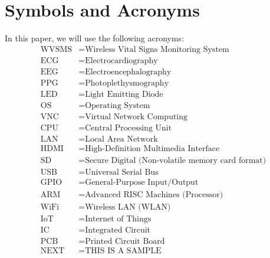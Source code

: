 
\chapter*{Symbols and  Acronyms}
  

\vspace{1cm}

In this paper, we  will  use the  following  acronyms:
\begin{align*}
\mbox{WVSMS} & =  \mbox{Wireless Vital Signs Monitoring System}    \\
\mbox{ECG} & =  \mbox{Electrocardiography}     \\
\mbox{EEG} & =  \mbox{Electroencephalography}     \\
\mbox{PPG} & =  \mbox{Photoplethysmography}    \\
\mbox{LED} & =  \mbox{Light Emitting Diode} \\
\mbox{OS} & =  \mbox{Operating System}	\\
\mbox{VNC} & =  \mbox{Virtual Network Computing}  \\
\mbox{CPU} & =  \mbox{Central Processing Unit}  \\
\mbox{LAN} & =  \mbox{Local Area Network}  \\
\mbox{HDMI} & =  \mbox{High-Definition Multimedia Interface}  \\
\mbox{SD} & =  \mbox{Secure Digital (Non-volatile memory card format)}  \\
\mbox{USB} & =  \mbox{Universal Serial Bus}  \\
\mbox{GPIO} & =  \mbox{General-Purpose Input/Output}  \\
\mbox{ARM} & =  \mbox{Advanced RISC Machines (Processor)}  \\
\mbox{WiFi} & =  \mbox{Wireless LAN (WLAN)}  \\
\mbox{IoT} & =  \mbox{Internet of Things}  \\
\mbox{IC} & =  \mbox{Integrated Circuit} \\
\mbox{PCB} & =  \mbox{Printed Circuit Board}  \\
\mbox{NEXT} & =  \mbox{THIS IS A SAMPLE} 
\end{align*}

